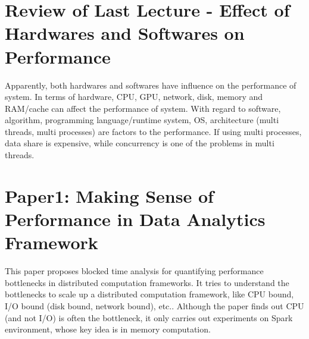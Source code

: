 \newtheorem{theorem}{Theorem}[lecnum]
\newtheorem{lemma}[theorem]{Lemma}
\newtheorem{proposition}[theorem]{Proposition}
\newtheorem{claim}[theorem]{Claim}
\newtheorem{corollary}[theorem]{Corollary}
\newtheorem{definition}[theorem]{Definition}
\newenvironment{proof}{{\bf Proof:}}{\hfill\rule{2mm}{2mm}}

\makeatletter
\def\eqalign#1{\,\vcenter{\openup\jot\m@th
 \ialign{\strut\hfil$\displaystyle{##}$&$\displaystyle{{}##}$\hfil
     \crcr#1\crcr}}\,}
\def\eqalignno#1{\displ@y \tabskip\@centering
 \halign to\displaywidth{\hfil$\displaystyle{##}$\tabskip\z@skip
   &$\displaystyle{{}##}$\hfil\tabskip\@centering
   &\llap{$##$}\tabskip\z@skip\crcr
   #1\crcr}}
\def\leqalignno#1{\displ@y \tabskip\@centering
 \halign to\displaywidth{\hfil$\displaystyle{##}$\tabskip\z@skip
   &$\displaystyle{{}##}$\hfil\tabskip\@centering
   &\kern-\displaywidth\rlap{$##$}\tabskip\displaywidth\crcr
   #1\crcr}}
\makeatother








\section{Review of Last Lecture - Effect of Hardwares and Softwares on Performance}
Apparently, both hardwares and softwares have influence on the performance of system. In terms of hardware, CPU, GPU, network, disk, memory and RAM/cache can affect the performance of system. With regard to software, algorithm, programming language/runtime system, OS, architecture (multi threads, multi processes) are factors to the performance. If using multi processes, data share is expensive, while concurrency is one of the problems in multi threads.

\section{Paper1: Making Sense of Performance in Data Analytics Framework}
This paper proposes blocked time analysis for quantifying performance bottlenecks in distributed computation frameworks. It tries to understand the bottlenecks to scale up a distributed computation framework, like CPU bound, I/O bound (disk bound, network bound), etc.. Although the paper finds out CPU (and not I/O) is often the bottleneck, it only carries out experiments on Spark environment, whose key idea is in memory computation.

